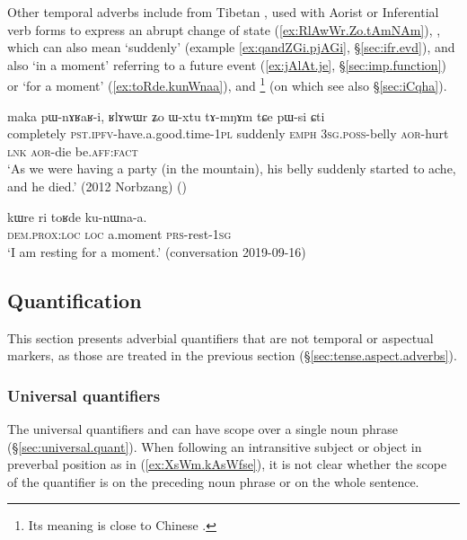Other temporal adverbs include  from Tibetan , used with Aorist or Inferential verb forms to express an abrupt change of state  (\ref{ex:RlAwWr.Zo.tAmNAm}), , which can also mean `suddenly' (example \ref{ex:qandZGi.pjAGi}, §\ref{sec:ifr.evd}), and also  `in a moment' referring to a future event (\ref{ex:jAlAt.je}, §\ref{sec:imp.function}) or `for a moment' (\ref{ex:toRde.kunWnaa}), and \footnote{Its meaning is close to Chinese .} (on which see also §\ref{sec:iCqha}).


\begin{exe}
\ex \label{ex:RlAwWr.Zo.tAmNAm}
\gll maka pɯ-nɤʁaʁ-i, ʁlɤwɯr ʑo ɯ-xtu tɤ-mŋɤm tɕe pɯ-si ɕti  \\
completely \textsc{pst}.\textsc{ipfv}-have.a.good.time-\textsc{1pl} suddenly \textsc{emph} \textsc{3sg}.\textsc{poss}-belly \textsc{aor}-hurt \textsc{lnk} \textsc{aor}-die be.\textsc{aff}:\textsc{fact} \\
\glt `As we were having a party (in the mountain), his belly suddenly started to ache, and he died.' (2012 Norbzang)
()
\end{exe}
 

\begin{exe}
\ex \label{ex:toRde.kunWnaa}
\gll kɯre ri toʁde ku-nɯna-a. \\
\textsc{dem}.\textsc{prox}:\textsc{loc} \textsc{loc} a.moment \textsc{prs}-rest-\textsc{1sg} \\
\glt `I am resting for a moment.' (conversation 2019-09-16)
\end{exe}

\subsection{Quantification} \label{sec:quantification.adverbs}
  This section presents adverbial quantifiers that are not temporal or aspectual markers, as those are treated in the previous section (§\ref{sec:tense.aspect.adverbs}).
 
\subsubsection{Universal quantifiers}  \label{sec:universal.quantification.adverbs}
The universal quantifiers  and  can have scope over a single noun phrase  (§\ref{sec:universal.quant}). When following an intransitive subject or object in preverbal position as in (\ref{ex:XsWm.kAsWfse}), it is not clear whether the scope of the quantifier is on the preceding noun phrase or on the whole sentence.  

